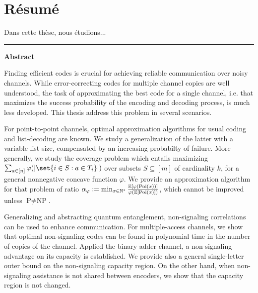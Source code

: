 \chapter*{Résumé}

\begin{otherlanguage}{french}
  Dans cette thèse, nous étudions...
\end{otherlanguage}
\clearpage

\flushright
\bigskip
\hrule \bigskip \bigskip
{\Huge \textbf{\textsf{Abstract}}}
\flushleftright
{}
\vspace{1.5cm}

Finding efficient codes is crucial for achieving reliable communication over noisy channels. While error-correcting codes for multiple channel copies are well understood, the task of approximating the best code for a single channel, i.e. that maximizes the success probability of the encoding and decoding process, is much less developed. This thesis address this problem in several scenarios.

For point-to-point channels, optimal approximation algorithms for usual coding and list-decoding are known. We study a generalization of the latter with a variable list size, compensated by an increasing probabilty of failure. More generally, we study the coverage problem which entails maximizing $\sum_{a \in [n]}  \varphi(\abs{\set{i \in S : a \in T_i}})$ over subsets $S \subseteq [m]$ of cardinality $k$, for a general nonnegative concave function $\varphi$. We provide an approximation algorithm for that problem of ratio $\alpha_{\varphi} := \min_{x \in \mathbb{N}^*} \frac{\mathbb{E}[\varphi(\operatorname{\text{Poi}}(x))]}{\varphi(\mathbb{E}[\operatorname{\text{Poi}}(x)])}$, which cannot be improved unless $\textrm{P}\not=\textrm{NP}$.

Generalizing and abstracting quantum entanglement, non-signaling correlations can be used to enhance communication. For multiple-access channels, we show that optimal non-signaling codes can be found in polynomial time in the number of copies of the channel. Applied the binary adder channel, a non-signaling advantage on its capacity is established. We provide also a general single-letter outer bound on the non-signaling capacity region. On the other hand, when non-signaling assistance is not shared between encoders, we show that the capacity region is not changed.

